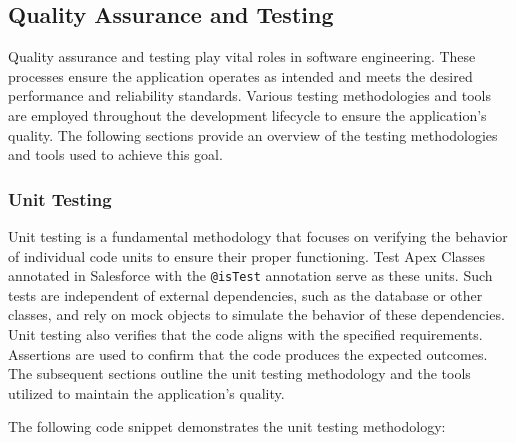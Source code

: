 \documentclass[12pt]{article}
\begin{document}
\subsection{Quality Assurance and Testing} Quality assurance and testing play vital roles in software engineering. These processes ensure the application operates as intended and meets the desired performance and reliability standards. Various testing methodologies and tools are employed throughout the development lifecycle to ensure the application's quality. The following sections provide an overview of the testing methodologies and tools used to achieve this goal.

\subsubsection{Unit Testing} Unit testing is a fundamental methodology that focuses on verifying the behavior of individual code units to ensure their proper functioning. Test Apex Classes annotated in Salesforce with the \texttt{@isTest} annotation serve as these units. Such tests are independent of external dependencies, such as the database or other classes, and rely on mock objects to simulate the behavior of these dependencies. Unit testing also verifies that the code aligns with the specified requirements. Assertions are used to confirm that the code produces the expected outcomes. The subsequent sections outline the unit testing methodology and the tools utilized to maintain the application's quality.

The following code snippet demonstrates the unit testing methodology:
\end{document}
